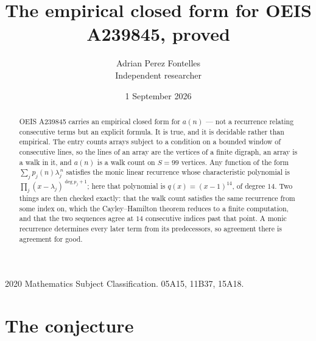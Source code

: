 \documentclass[11pt,a4paper]{article}
\title{The empirical closed form for OEIS A239845, proved}
\author{Adrian Perez Fontelles\\ \small Independent researcher}
\date{1 September 2026}
\theoremstyle{plain}
\theoremstyle{definition}
\begin{document}
\maketitle

\begin{abstract}
OEIS A239845 carries an empirical closed form for $a(n)$ --- not a recurrence relating
consecutive terms but an explicit formula. It is true, and it is decidable rather than
empirical. The entry counts arrays subject to a condition on a bounded window of consecutive lines, so the lines of an array are the
vertices of a finite digraph, an array is a walk in it, and $a(n)$ is a walk count on
$S=99$ vertices. Any function of the form $\sum_j p_j(n)\lambda_j^{\,n}$ satisfies the
monic linear recurrence whose characteristic polynomial is
$\prod_j(x-\lambda_j)^{\deg p_j+1}$; here that polynomial is $q(x)=(x-1)^{14}$, of degree
$14$. Two things are then checked exactly: that the walk count satisfies the same
recurrence from some index on, which the Cayley--Hamilton theorem reduces to a finite
computation, and that the two sequences agree at $14$ consecutive indices past that
point. A monic recurrence determines every later term from its predecessors, so agreement
there is agreement for good.
\end{abstract}

\noindent\small 2020 Mathematics Subject Classification. 05A15, 11B37, 15A18.\normalsize

\section{The conjecture}
\end{document}
